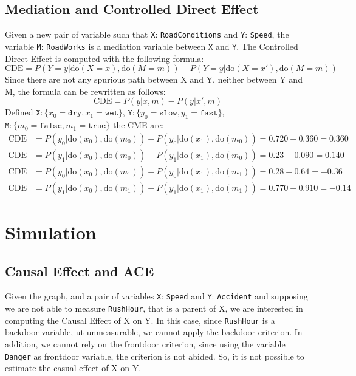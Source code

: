 \documentclass[a4paper,12pt]{article} %
\begin{document}
\subsection*{Mediation and Controlled Direct Effect}
Given a new pair of variable such that \texttt{X}: \texttt{RoadConditions} and \texttt{Y}: \texttt{Speed}, the variable \texttt{M}: \texttt{RoadWorks} is a mediation variable between \texttt{X} and \texttt{Y}.
The Controlled Direct Effect is computed with the following formula:
\begin{equation}
	\text{CDE} = P(Y = y|\mathrm{do}(X = x),\mathrm{do}(M = m)) - P(Y = y|\mathrm{do}(X = x'),\mathrm{do}(M = m))
\end{equation}
Since there are not any spurious path between X and Y, neither between Y and M, the formula can be rewritten as follows:
\begin{equation*}
\text{CDE} = P(y| x, m) - P(y|x',m)
\end{equation*}
Defined $\mathtt{X}: \{ x_0=\mathtt{dry}, x_1=\mathtt{wet}\}$, $\mathtt{Y}: \{ y_0=\mathtt{slow}, y_1=\mathtt{fast}\}$, $\mathtt{M}: \{ m_0=\mathtt{false}, m_1=\mathtt{true}\}$ the CME are: 
\begin{equation*}
\begin{aligned}
\text{CDE} &= P(y_0|\mathrm{do}(x_0),\mathrm{do}(m_0)) - P(y_0|\mathrm{do}(x_1),\mathrm{do}(m_0)) = 0.720 - 0.360 = 0.360\\
\text{CDE} &= P(y_1|\mathrm{do}(x_0),\mathrm{do}(m_0)) - P(y_1|\mathrm{do}(x_1),\mathrm{do}(m_0))= 0.23 - 0.090 = 0.140\\
\text{CDE} &= P(y_0|\mathrm{do}(x_0),\mathrm{do}(m_1)) - P(y_0|\mathrm{do}(x_1),\mathrm{do}(m_1))=0.28 - 0.64 = -0.36\\
\text{CDE} &= P(y_1|\mathrm{do}(x_0),\mathrm{do}(m_1)) - P(y_1|\mathrm{do}(x_1),\mathrm{do}(m_1))=0.770 - 0.910 = -0.14
\end{aligned}
\end{equation*}

\section{Simulation}
\subsection*{Causal Effect and ACE}
Given the graph, and a pair of variables \texttt{X}: \texttt{Speed} and \texttt{Y}: \texttt{Accident} and supposing we are not able to measure \texttt{RushHour}, that is a parent of X, we are interested in computing the Causal Effect of X on Y.
In this case, since \texttt{RushHour} is a backdoor variable, ut unmeasurable, we cannot apply the backdoor criterion. In addition, we cannot rely on the frontdoor criterion, since using the variable \texttt{Danger} as frontdoor variable, the criterion is not abided.
So, it is not possible to estimate the casual effect of X on Y.
\end{document}
